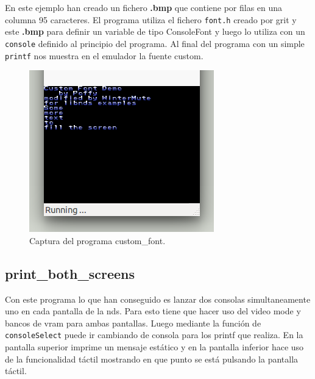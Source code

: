 \documentclass[12pt,english]{article}
\begin{document}
    En este ejemplo han creado un fichero \textbf{.bmp} que contiene por filas en una columna 95 caracteres. El programa utiliza el fichero \texttt{font.h} creado por grit y este \textbf{.bmp} para definir un variable de tipo ConsoleFont y luego lo utiliza con un \texttt{console} definido al principio del programa. Al final del programa con un simple \texttt{printf} nos muestra en el emulador la fuente custom.

    \begin{figure}[H] 
    \centering
    \includegraphics[scale=0.5]{p3Media/custom_font}
    \caption{Captura del programa custom\_font.}
    \end{figure}

    \newpage

    \subsection{print\_both\_screens}

    Con este programa lo que han conseguido es lanzar dos consolas simultaneamente uno en cada pantalla de la nds. Para esto tiene que hacer uso del video mode y bancos de vram para ambas pantallas. Luego mediante la función de \texttt{consoleSelect} puede ir cambiando de consola para los printf que realiza. En la pantalla superior imprime un mensaje estático y en la pantalla inferior hace uso de la funcionalidad táctil mostrando en que punto se está pulsando la pantalla táctil.
\end{document}
